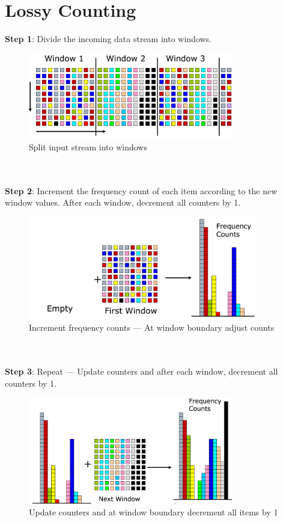 \documentclass[a4paper, 12pt]{book} %
\begin{document}
\section{Lossy Counting}
\textbf{Step 1}: Divide the incoming data stream into windows. 
\begin{figure}[htpb]
	\centering
	\includegraphics[width=9cm]{figures/step_1_lossy_counting.png}
	\caption{Split input stream into windows}
	\label{fig:boat1}
\end{figure}
\\\\
\textbf{Step 2}: Increment the frequency count of each item according to the new window values. After each window, decrement all counters by 1.
\begin{figure}[htpb]
	\centering
	\includegraphics[width=10cm]{figures/step_2_lossy_counting.png}
	\caption{Increment frequency counts --- At window boundary adjust counts}
	\label{fig:boat1}
\end{figure}
\\\\
\textbf{Step 3}: Repeat --- Update counters and after each window, decrement all counters by 1.
\begin{figure}[htpb]
	\centering
	\includegraphics[width=9cm]{figures/step_3_lossy_counting.png}
	\caption{Update counters and at window boundary decrement all items by 1}
	\label{fig:boat1}
\end{figure}
\end{document}
